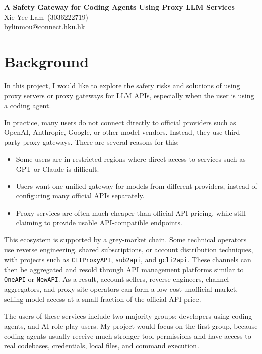\documentclass[11pt]{article}
\makeatletter
\newcommand{\studentname}{Xie Yee Lam}
\newcommand{\studentid}{3036222719}
\newcommand{\email}{bylinmou@connect.hku.hk}
\newcommand{\projecttitle}{A Safety Gateway for Coding Agents Using Proxy LLM Services}
\makeatother
\begin{document}
\begin{center}
  {\LARGE \textbf{\projecttitle}}\\
  \vspace{0.5em}
  {\studentname\ (\studentid)}\\
  {\email}
\end{center}

\section*{Background}

In this project, I would like to explore the safety risks and solutions of using proxy servers or proxy gateways for LLM APIs, especially when the user is using a coding agent.

In practice, many users do not connect directly to official providers such as OpenAI, Anthropic, Google, or other model vendors. Instead, they use third-party proxy gateways. There are several reasons for this:

\begin{itemize}[leftmargin=*]
  \item Some users are in restricted regions where direct access to services such as GPT or Claude is difficult.
  \item Users want one unified gateway for models from different providers, instead of configuring many official APIs separately.
  \item Proxy services are often much cheaper than official API pricing, while still claiming to provide usable API-compatible endpoints.
\end{itemize}

This ecosystem is supported by a grey-market chain. Some technical operators use reverse engineering, shared subscriptions, or account distribution techniques, with projects such as \texttt{CLIProxyAPI}, \texttt{sub2api}, and \texttt{gcli2api}. These channels can then be aggregated and resold through API management platforms similar to \texttt{OneAPI} or \texttt{NewAPI}. As a result, account sellers, reverse engineers, channel aggregators, and proxy site operators can form a low-cost unofficial market, selling model access at a small fraction of the official API price.

The users of these services include two majority groups: developers using coding agents, and AI role-play users. My project would focus on the first group, because coding agents usually receive much stronger tool permissions and have access to real codebases, credentials, local files, and command execution.
\end{document}
